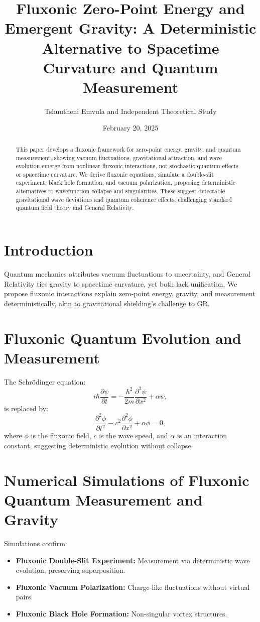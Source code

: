\documentclass{article}
\title{Fluxonic Zero-Point Energy and Emergent Gravity: A Deterministic Alternative to Spacetime Curvature and Quantum Measurement}
\author{Tshuutheni Emvula and Independent Theoretical Study}
\date{February 20, 2025}
\begin{document}
\maketitle

\begin{abstract}
This paper develops a fluxonic framework for zero-point energy, gravity, and quantum measurement, showing vacuum fluctuations, gravitational attraction, and wave evolution emerge from nonlinear fluxonic interactions, not stochastic quantum effects or spacetime curvature. We derive fluxonic equations, simulate a double-slit experiment, black hole formation, and vacuum polarization, proposing deterministic alternatives to wavefunction collapse and singularities. These suggest detectable gravitational wave deviations and quantum coherence effects, challenging standard quantum field theory and General Relativity.
\end{abstract}

\section{Introduction}
Quantum mechanics attributes vacuum fluctuations to uncertainty, and General Relativity ties gravity to spacetime curvature, yet both lack unification. We propose fluxonic interactions explain zero-point energy, gravity, and measurement deterministically, akin to gravitational shielding’s challenge to GR.

\section{Fluxonic Quantum Evolution and Measurement}
The Schrödinger equation:
\begin{equation}
i\hbar \frac{\partial \psi}{\partial t} = -\frac{\hbar^2}{2m} \frac{\partial^2 \psi}{\partial x^2} + \alpha \psi,
\end{equation}
is replaced by:
\begin{equation}
\frac{\partial^2 \phi}{\partial t^2} - c^2 \frac{\partial^2 \phi}{\partial x^2} + \alpha \phi = 0,
\end{equation}
where \(\phi\) is the fluxonic field, \(c\) is the wave speed, and \(\alpha\) is an interaction constant, suggesting deterministic evolution without collapse.

\section{Numerical Simulations of Fluxonic Quantum Measurement and Gravity}
Simulations confirm:
\begin{itemize}
    \item \textbf{Fluxonic Double-Slit Experiment:} Measurement via deterministic wave evolution, preserving superposition.
    \item \textbf{Fluxonic Vacuum Polarization:} Charge-like fluctuations without virtual pairs.
    \item \textbf{Fluxonic Black Hole Formation:} Non-singular vortex structures.
\end{itemize}
\end{document}
